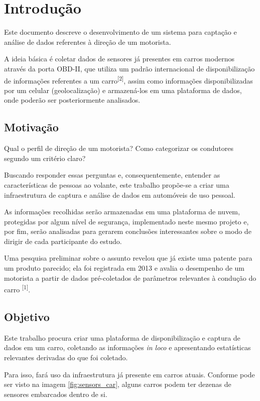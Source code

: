 \chapter{Introdução}\label{CAP:introducao}

Este documento descreve o desenvolvimento de um sistema para captação e análise de dados referentes à direção de um motorista.

A ideia básica é coletar dados de sensores já presentes em carros modernos através da porta OBD-II, que utiliza um padrão internacional de disponibilização de informações referentes a um carro\textsuperscript{[2]}, assim como informações disponibilizadas por um celular (geolocalização) e armazená-los em uma plataforma de dados, onde poderão ser posteriormente analisados.

\section{Motivação}

Qual o perfil de direção de um motorista? Como categorizar os condutores segundo um critério claro?

Buscando responder essas perguntas e, consequentemente, entender as características de pessoas ao volante, este trabalho propõe-se a criar uma infraestrutura de captura e análise de dados em automóveis de uso pessoal.

As informações recolhidas serão armazenadas em uma plataforma de nuvem, protegidas por algum nível de segurança, implementado neste mesmo projeto e, por fim, serão analisadas para gerarem conclusões interessantes sobre o modo de dirigir de cada participante do estudo.
	
Uma pesquisa preliminar sobre o assunto revelou que já existe uma patente para um produto parecido; ela foi registrada em 2013 e avalia o desempenho de um motorista a partir de dados pré-coletados de parâmetros relevantes à condução do carro \textsuperscript{[1]}.

\section{Objetivo}

Este trabalho procura criar uma plataforma de disponibilização e captura de dados em um carro, coletando as informações \textit{in loco} e apresentando estatísticas relevantes derivadas do que foi coletado.

Para isso, fará uso da infraestrutura já presente em carros atuais. Conforme pode ser visto na imagem \ref{fig:sensors_car}, alguns carros podem ter dezenas de sensores embarcados dentro de si.


